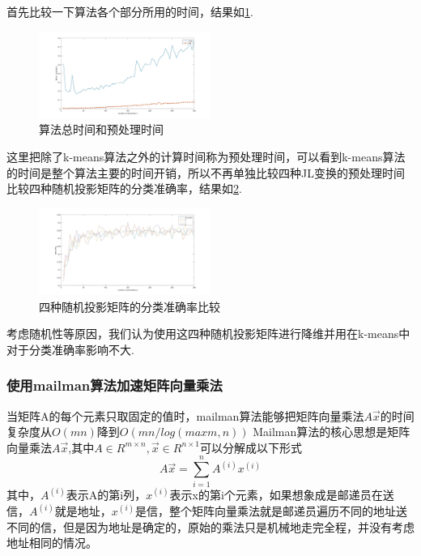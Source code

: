 \documentclass{ctexart}
\begin{document}
    首先比较一下算法各个部分所用的时间，结果如\ref{time4}.
    \begin{figure}[h]
        \centering
        \includegraphics[width=0.50\textwidth]{result/total_pre.jpg}
        \caption{算法总时间和预处理时间}
        \label{time4}
    \end{figure}

    这里把除了k-means算法之外的计算时间称为预处理时间，可以看到k-means算法的时间是整个算法主要的时间开销，所以不再单独比较四种JL变换的预处理时间\\

    比较四种随机投影矩阵的分类准确率，结果如\ref{accu4}.
    \begin{figure}[h]
        \centering
        \includegraphics[width=0.50\textwidth]{result/accu.jpg}
        \caption{四种随机投影矩阵的分类准确率比较}
        \label{accu4}
    \end{figure}

    考虑随机性等原因，我们认为使用这四种随机投影矩阵进行降维并用在k-means中对于分类准确率影响不大.\\

    \subsubsection{使用mailman算法加速矩阵向量乘法}
    当矩阵A的每个元素只取固定的值时，mailman算法\cite{10.1016/j.ipl.2008.09.028}能够把矩阵向量乘法$A\vec{x}$的时间复杂度从$O(mn)$降到$O(mn/log(max{m,n}))$
    Mailman算法的核心思想是矩阵向量乘法$A\vec{x}$,其中$A \in R^{m \times n}, \vec{x}\in R^{n \times 1}$可以分解成以下形式\\
    \begin{equation*}
    A\vec{x} = \sum_{i=1}^n A^{(i)}x^{(i)}
    \end{equation*}
    其中，$A^{(i)}$表示A的第i列，$x^{(i)}$表示x的第i个元素，如果想象成是邮递员在送信，$A^{(i)}$就是地址，$x^{(i)}$是信，整个矩阵向量乘法就是邮递员遍历不同的地址送不同的信，但是因为地址是确定的，原始的乘法只是机械地走完全程，并没有考虑地址相同的情况。\\
\end{document}
